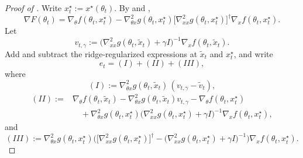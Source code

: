 \documentclass{article}
\theoremstyle{normaltheorem}
\begin{document}
\begin{proof}[Proof of ]
Write $x_t^\star:=x^\star(\theta_t)$.
By  and ,
\[
\nabla F(\theta_t)
=
\nabla_\theta f(\theta_t,x_t^\star)
-\nabla^2_{\theta x}g(\theta_t,x_t^\star)
\big[\nabla^2_{xx}g(\theta_t,x_t^\star)\big]^\dagger
\nabla_x f(\theta_t,x_t^\star).
\]
Let
\[
v_{t,\gamma}
:=
\big(\nabla^2_{xx}g(\theta_t,\tilde x_t)+\gamma I\big)^{-1}\nabla_x f(\theta_t,\tilde x_t).
\]
Add and subtract the ridge-regularized expressions at \(\tilde x_t\) and \(x_t^\star\), and write
\[
e_t=(I)+(II)+(III),
\]
where
\[
(I):=\nabla^2_{\theta x}g(\theta_t,\tilde x_t)\,(v_{t,\gamma}-\tilde v_t),
\]
\[
\begin{aligned}
(II):={}&
\nabla_\theta f(\theta_t,\tilde x_t)
-\nabla^2_{\theta x}g(\theta_t,\tilde x_t)v_{t,\gamma}
-\nabla_\theta f(\theta_t,x_t^\star)\\
&\quad
+\nabla^2_{\theta x}g(\theta_t,x_t^\star)
\big(\nabla^2_{xx}g(\theta_t,x_t^\star)+\gamma I\big)^{-1}
\nabla_x f(\theta_t,x_t^\star),
\end{aligned}
\]
and
\[
(III):=
\nabla^2_{\theta x}g(\theta_t,x_t^\star)
\Big(
\big[\nabla^2_{xx}g(\theta_t,x_t^\star)\big]^\dagger
-\big(\nabla^2_{xx}g(\theta_t,x_t^\star)+\gamma I\big)^{-1}
\Big)
\nabla_x f(\theta_t,x_t^\star).
\]


\end{proof}
\end{document}
